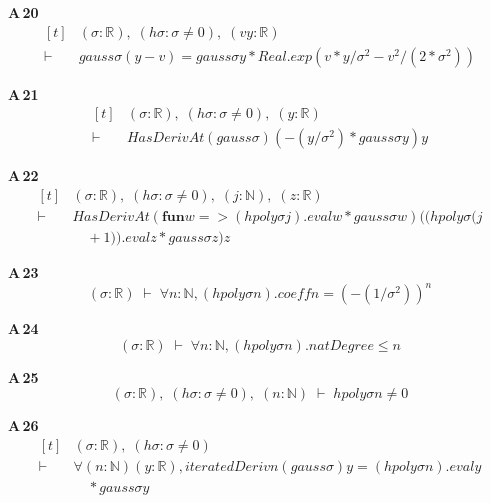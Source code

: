 \noindent\textbf{A\,20}\quad{}
{\footnotesize\[ \begin{aligned}[t]
&(\sigma : \mathbb{R} ),\; (\mathit{hσ} : \sigma \neq 0),\; (\mathit{v} \mathit{y} : \mathbb{R} )\\
\vdash\;&\mathit{gauss} \sigma (\mathit{y} - \mathit{v}) = \mathit{gauss} \sigma \mathit{y} * \mathit{Real}.\mathit{exp} (\mathit{v} * \mathit{y} / \sigma ^{2} - \mathit{v} ^{2} / (2 * \sigma ^{2}))
\end{aligned} \]}

\noindent\textbf{A\,21}\quad{}
{\footnotesize\[ \begin{aligned}[t]
&(\sigma : \mathbb{R} ),\; (\mathit{hσ} : \sigma \neq 0),\; (\mathit{y} : \mathbb{R} )\\
\vdash\;&\mathit{HasDerivAt} (\mathit{gauss} \sigma ) (-(\mathit{y} / \sigma ^{2}) * \mathit{gauss} \sigma \mathit{y}) \mathit{y}
\end{aligned} \]}

\noindent\textbf{A\,22}\quad{}
{\footnotesize\[ \begin{aligned}[t]
&(\sigma : \mathbb{R} ),\; (\mathit{hσ} : \sigma \neq 0),\; (\mathit{j} : \mathbb{N} ),\; (\mathit{z} : \mathbb{R} )\\
\vdash\;&\mathit{HasDerivAt} (\mathbf{fun} \mathit{w} => (\mathit{hpoly} \sigma \mathit{j}).\mathit{eval} \mathit{w} * \mathit{gauss} \sigma \mathit{w}) ((\mathit{hpoly} \sigma (\mathit{j}\\
&\quad + 1)).\mathit{eval} \mathit{z} * \mathit{gauss} \sigma \mathit{z}) \mathit{z}
\end{aligned} \]}

\noindent\textbf{A\,23}\quad{}
{\footnotesize\[ (\sigma : \mathbb{R} ) \;\vdash\; \forall \mathit{n} : \mathbb{N} , (\mathit{hpoly} \sigma \mathit{n}).\mathit{coeff} \mathit{n} = (-(1 / \sigma ^{2})) ^{\mathit{n}} \]}

\noindent\textbf{A\,24}\quad{}
{\footnotesize\[ (\sigma : \mathbb{R} ) \;\vdash\; \forall \mathit{n} : \mathbb{N} , (\mathit{hpoly} \sigma \mathit{n}).\mathit{natDegree} \leq \mathit{n} \]}

\noindent\textbf{A\,25}\quad{}
{\footnotesize\[ (\sigma : \mathbb{R} ),\; (\mathit{hσ} : \sigma \neq 0),\; (\mathit{n} : \mathbb{N} ) \;\vdash\; \mathit{hpoly} \sigma \mathit{n} \neq 0 \]}

\noindent\textbf{A\,26}\quad{}
{\footnotesize\[ \begin{aligned}[t]
&(\sigma : \mathbb{R} ),\; (\mathit{hσ} : \sigma \neq 0)\\
\vdash\;&\forall (\mathit{n} : \mathbb{N} ) (\mathit{y} : \mathbb{R} ), \mathit{iteratedDeriv} \mathit{n} (\mathit{gauss} \sigma ) \mathit{y} = (\mathit{hpoly} \sigma \mathit{n}).\mathit{eval} \mathit{y}\\
&\quad * \mathit{gauss} \sigma \mathit{y}
\end{aligned} \]}

